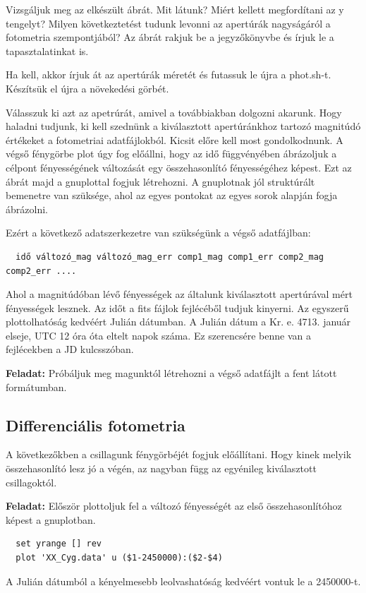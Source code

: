 \documentclass{article}
\begin{document}
Vizsgáljuk meg az elkészült ábrát. Mit látunk? Miért kellett megfordítani az y
tengelyt? Milyen következtetést tudunk levonni az apertúrák nagyságáról a
fotometria szempontjából? Az ábrát rakjuk be a jegyzőkönyvbe és írjuk le a
tapasztalatinkat is.

Ha kell, akkor írjuk át az apertúrák méretét és futassuk le újra a phot.sh-t.
Készítsük el újra a növekedési görbét.

Válasszuk ki azt az apetrúrát, amivel a továbbiakban dolgozni akarunk.
Hogy haladni tudjunk, ki kell szednünk a kiválasztott apertúránkhoz tartozó
magnitúdó értékeket a fotometriai adatfájlokból.
Kicsit előre kell most gondolkodnunk. A végső fénygörbe plot úgy fog előállni,
hogy az idő függvényében ábrázoljuk a célpont fényességének változását egy
összehasonlító fényességéhez képest. Ezt az ábrát majd a gnuplottal fogjuk
létrehozni. A gnuplotnak jól struktúrált bemenetre van szüksége, ahol az egyes
pontokat az egyes sorok alapján fogja ábrázolni.

Ezért a következő adatszerkezetre van szükségünk a végső adatfájlban:
\begin{verbatim}
  idő változó_mag változó_mag_err comp1_mag comp1_err comp2_mag comp2_err ....
\end{verbatim}

Ahol a magnitúdóban lévő fényességek az általunk kiválasztott apertúrával mért
fényességek lesznek.
Az időt a fits fájlok fejlécéből tudjuk kinyerni. Az egyszerű plottolhatóság
kedvéért Julián dátumban. A Julián dátum a Kr. e. 4713. január elseje, UTC 12
óra óta eltelt napok száma. Ez szerencsére benne van a fejlécekben a JD
kulcsszóban.

{\bf Feladat:}
Próbáljuk meg magunktól létrehozni a végső adatfájlt a fent látott formátumban.

\subsection{Differenciális fotometria}

A következőkben a csillagunk fénygörbéjét fogjuk előállítani. Hogy kinek melyik
összehasonlító lesz jó a végén, az nagyban függ az egyénileg kiválasztott
csillagoktól.

{\bf Feladat:}
Először plottoljuk fel a változó fényességét az első összehasonlítóhoz képest a
gnuplotban.

\begin{verbatim}
  set yrange [] rev
  plot 'XX_Cyg.data' u ($1-2450000):($2-$4)
\end{verbatim}
A Julián dátumból a kényelmesebb leolvashatóság kedvéért vontuk le a 2450000-t.
\end{document}
